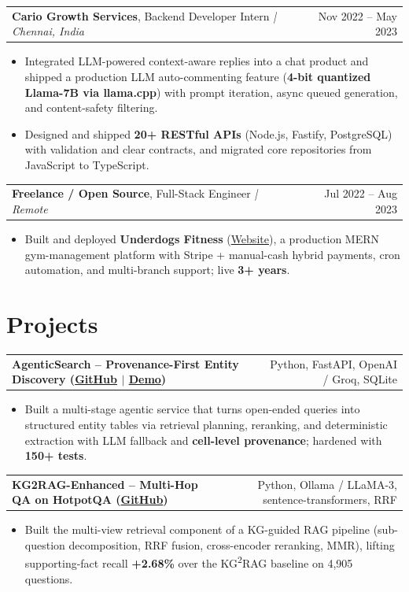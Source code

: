\documentclass[letterpaper,11pt]{article}
\makeatletter
\newcommand{\expItem}[4]{%
  \vspace{3pt}
  \begin{tabular*}{\textwidth}{@{}l@{\extracolsep{\fill}}r@{}}
    \textbf{#1}, #2 \textit{| #3} & #4 \\
  \end{tabular*}\par\vspace{-2pt}
}
\newcommand{\projItem}[2]{%
  \vspace{6pt}
  \begin{tabular*}{\textwidth}{@{}l@{\extracolsep{\fill}}r@{}}
    \textbf{#1} & #2 \\
  \end{tabular*}\par\vspace{-2pt}
}
\makeatother
\begin{document}
\expItem{Cario Growth Services}{Backend Developer Intern}{Chennai, India}{Nov 2022 -- May 2023}
\begin{itemize}
  \item Integrated LLM-powered context-aware replies into a chat product and shipped a production LLM auto-commenting feature (\textbf{4-bit quantized Llama-7B via llama.cpp}) with prompt iteration, async queued generation, and content-safety filtering.
  \item Designed and shipped \textbf{20+ RESTful APIs} (Node.js, Fastify, PostgreSQL) with validation and clear contracts, and migrated core repositories from JavaScript to TypeScript.
\end{itemize}

\expItem{Freelance / Open Source}{Full-Stack Engineer}{Remote}{Jul 2022 -- Aug 2023}
\begin{itemize}
  \item Built and deployed \textbf{Underdogs Fitness} (\href{https://www.underdogsfitness.in/}{Website}), a production MERN gym-management platform with Stripe + manual-cash hybrid payments, cron automation, and multi-branch support; live \textbf{3+ years}.
\end{itemize}

\section{Projects}

\projItem{AgenticSearch -- Provenance-First Entity Discovery {\normalfont\small(\href{https://github.com/Deva-1903/ciir_agentic_search}{GitHub} $\vert$ \href{https://agentic-search-negglszkwa-uc.a.run.app}{Demo})}}{Python, FastAPI, OpenAI / Groq, SQLite}
\begin{itemize}
  \item Built a multi-stage agentic service that turns open-ended queries into structured entity tables via retrieval planning, reranking, and deterministic extraction with LLM fallback and \textbf{cell-level provenance}; hardened with \textbf{150+ tests}.
\end{itemize}

\projItem{KG2RAG-Enhanced -- Multi-Hop QA on HotpotQA {\normalfont\small(\href{https://github.com/Deva-1903/KG2RAG-685-NLP}{GitHub})}}{Python, Ollama / LLaMA-3, sentence-transformers, RRF}
\begin{itemize}
  \item Built the multi-view retrieval component of a KG-guided RAG pipeline (sub-question decomposition, RRF fusion, cross-encoder reranking, MMR), lifting supporting-fact recall \textbf{+2.68\%} over the KG\textsuperscript{2}RAG baseline on 4{,}905 questions.
\end{itemize}
\end{document}
